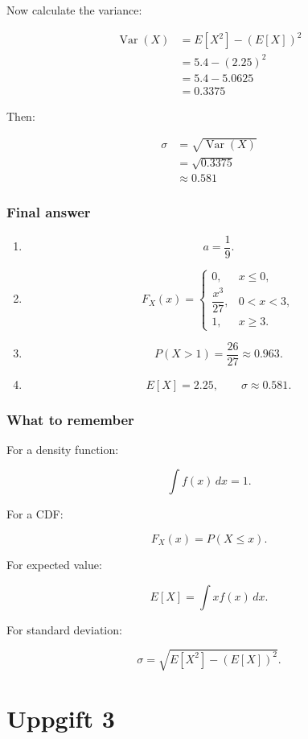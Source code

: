 \documentclass[10pt]{article}
\begin{document}
Now calculate the variance:

\begin{align*}
\operatorname{Var}(X)
&=
E[X^2]-(E[X])^2 \\[2mm]
&=
5.4-(2.25)^2 \\[2mm]
&=
5.4-5.0625 \\[2mm]
&=
0.3375
\end{align*}

Then:

\begin{align*}
\sigma
&=
\sqrt{\operatorname{Var}(X)} \\[2mm]
&=
\sqrt{0.3375} \\[2mm]
&\approx 0.581
\end{align*}

\subsubsection*{Final answer}
\begin{enumerate}[label=\alph*)]
\item
\[
a=\frac{1}{9}.
\]

\item
\[
F_X(x)=
\begin{cases}
0,
& x\leq 0,\\
\dfrac{x^3}{27},
& 0<x<3,\\
1,
& x\geq 3.
\end{cases}
\]

\item
\[
P(X>1)=\frac{26}{27}\approx 0.963.
\]

\item
\[
E[X]=2.25,
\qquad
\sigma\approx 0.581.
\]
\end{enumerate}

\subsubsection*{What to remember}
For a density function:

\[
\int f(x)\,dx=1.
\]

For a CDF:

\[
F_X(x)=P(X\leq x).
\]

For expected value:

\[
E[X]=\int x f(x)\,dx.
\]

For standard deviation:

\[
\sigma=
\sqrt{E[X^2]-(E[X])^2}.
\]

\section*{Uppgift 3}
\end{document}
